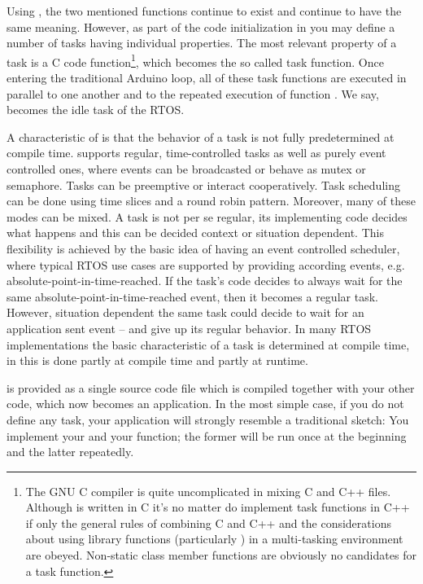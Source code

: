 Using \rtos{}, the two mentioned functions continue to exist and continue
to have the same meaning. However, as part of the code initialization in
 you may define a number of tasks having individual
properties. The most relevant property of a task is a C code
function\footnote{The GNU C compiler is quite uncomplicated in mixing C
and C++ files. Although \rtos{} is written in C it's no matter do
implement task functions in C++ if only the general rules of combining C
and C++ and the considerations about using library functions (particularly
) in a multi-tasking environment are obeyed. Non-static class
member functions are obviously no candidates for a task function.}, which
becomes the so called task function. Once entering the traditional Arduino
loop, all of these task functions are executed in parallel to one another
and to the repeated execution of function . We say,
 becomes the idle task of the RTOS.

A characteristic of \rtos{} is that the behavior of a task is not fully
predetermined at compile time. \rtos{} supports regular, time-controlled
tasks as well as purely event controlled ones, where events can be
broadcasted or behave as mutex or semaphore. Tasks can be preemptive or
interact cooperatively. Task scheduling can be done using time slices and
a round robin pattern. Moreover, many of these modes can be mixed. A task
is not per se regular, its implementing code decides what happens and this
can be decided context or situation dependent. This flexibility is
achieved by the basic idea of having an event controlled scheduler, where
typical RTOS use cases are supported by providing according events, e.g.
absolute-point-in-time-reached. If the task's code decides to always wait
for the same absolute-point-in-time-reached event, then it becomes a
regular task. However, situation dependent the same task could decide to
wait for an application sent event -- and give up its regular behavior. In
many RTOS implementations the basic characteristic of a task is determined
at compile time, in \rtos{} this is done partly at compile time and partly
at runtime.

\rtos{} is provided as a single source code file which is compiled together
with your other code, which now becomes an \rtos{} application. In the most
simple case, if you do not define any task, your application will strongly
resemble a traditional sketch: You implement your  and your
 function; the former will be run once at the beginning and
the latter repeatedly.

